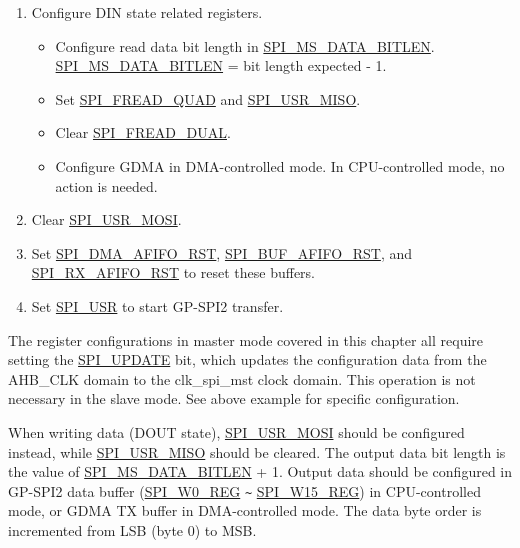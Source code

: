 \documentclass[main\_\_EN.tex]{subfiles}
\begin{document}
\begin{enumerate}
    \item Configure DIN state related registers.
        \begin{itemize}
            \item Configure read data bit length in \hyperref[fielddesc:SPIMSDATABITLEN]{SPI\_MS\_DATA\_BITLEN}. \hyperref[fielddesc:SPIMSDATABITLEN]{SPI\_MS\_DATA\_BITLEN} = bit length expected - 1.
            \item Set \hyperref[fielddesc:SPIFREADQUAD]{SPI\_FREAD\_QUAD} and \hyperref[fielddesc:SPIUSRMISO]{SPI\_USR\_MISO}.
            \item Clear \hyperref[fielddesc:SPIFREADDUAL]{SPI\_FREAD\_DUAL}.
            \item Configure GDMA in DMA-controlled mode. In CPU-controlled mode, no action is needed.
        \end{itemize}

    \item Clear \hyperref[fielddesc:SPIUSRMOSI]{SPI\_USR\_MOSI}.
    \item Set \hyperref[fielddesc:SPIDMAAFIFORST]{SPI\_DMA\_AFIFO\_RST}, \hyperref[fielddesc:SPIBUFAFIFORST]{SPI\_BUF\_AFIFO\_RST}, and \hyperref[fielddesc:SPIRXAFIFORST]{SPI\_RX\_AFIFO\_RST} to reset these buffers.

    \item Set \hyperref[fielddesc:SPIUSR]{SPI\_USR} to start GP-SPI2 transfer.
\end{enumerate}

\begin{tiplisting}
    The register configurations in master mode covered in this chapter all require setting the \hyperref[fielddesc:SPIUPDATE]{SPI\_UPDATE} bit, which updates the configuration data from the AHB\_CLK domain to the clk\_spi\_mst clock domain. This operation is not necessary in the slave mode. See above example for specific configuration.
    \end{tiplisting}

When writing data (DOUT state), \hyperref[fielddesc:SPIUSRMOSI]{SPI\_USR\_MOSI} should be configured instead, while \hyperref[fielddesc:SPIUSRMISO]{SPI\_USR\_MISO} should be cleared. The output data bit length is the value of \hyperref[fielddesc:SPIMSDATABITLEN]{SPI\_MS\_DATA\_BITLEN} + 1. Output data should be configured in GP-SPI2 data buffer (\hyperref[regdesc:SPIW0REG]{SPI\_W0\_REG} \verb+~+ \hyperref[regdesc:SPIW0REG]{SPI\_W15\_REG}) in CPU-controlled mode, or GDMA TX buffer in DMA-controlled mode. The data byte order is incremented from LSB (byte 0) to MSB.
\end{document}
